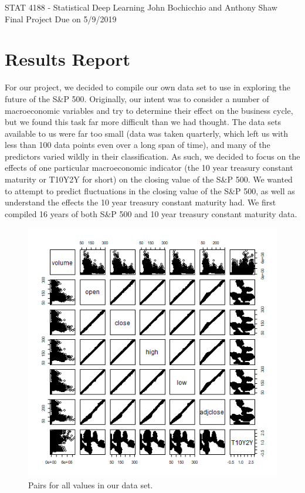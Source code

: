 \documentclass[12pt]{article}
\begin{document}
\pagestyle{plain}
\begin{center}
STAT 4188 - Statistical Deep Learning  \hfill John Bochicchio and Anthony Shaw \\
Final Project \hfill  Due on 5/9/2019
\end{center}
\section{Results Report}
\tab For our project, we decided to compile our own data set to use in exploring the future of the S\&P 500. Originally, our intent was to consider a number of macroeconomic variables and try to determine their effect on the business cycle, but we found this task far more difficult than we had thought. The data sets available to us were far too small (data was taken quarterly, which left us with less than 100 data points even over a long span of time), and many of the predictors varied wildly in their classification. As such, we decided to focus on the effects of one particular macroeconomic indicator (the 10 year treasury constant maturity or T10Y2Y for short) on the closing value of the S\&P 500. We wanted to attempt to predict fluctuations in the closing value of the S\&P 500, as well as understand the effects the 10 year treasury constant maturity had. We first compiled 16 years of both S\&P 500 and 10 year treasury constant maturity data.

\begin{figure}[H]
\centering
\includegraphics[scale=.5]{images/SPY-pairs.png}
\caption{Pairs for all values in our data set.}
\end{figure}
\end{document}
